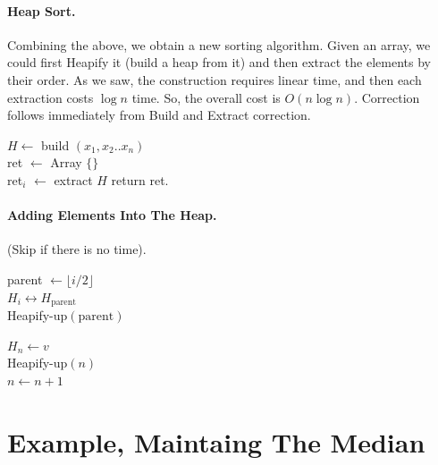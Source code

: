 \newpage


\paragraph{Heap Sort.}   
Combining the above, we obtain a new sorting algorithm. Given an array, we could first Heapify it (build a heap from it) and then extract the elements by their order. As we saw, the construction requires linear time, and then each extraction costs $\log n$ time. So, the overall cost is $O\left( n\log n  \right)$. Correction follows immediately from Build and Extract correction.  
\begin{algorithm}
  $H \leftarrow $ build $ \left( x_1, x_2 .. x_{n}  \right) $ \\ 
  ret $ \leftarrow $ Array $ \{ \} $ \\
   {
  ret$_{i}$ $\leftarrow$ extract $H$
  }
  return ret. 
\end{algorithm}

\paragraph{Adding Elements Into The Heap.} (Skip if there is no time).

\begin{algorithm}
parent $\leftarrow \lfloor i/2 \rfloor $ \\
 { 
  $ H_{i} \leftrightarrow H_{\text{parent}} $ \\ 
  Heapify-up$\left( \text{parent}  \right)$
}
\caption{Heapify-up.}
\end{algorithm}


\begin{algorithm}
$ H_{n} \leftarrow v $ \\ 
Heapify-up$\left( n \right)$\\
$ n \leftarrow n + 1 $ 
\caption{Insert-key}
\end{algorithm}

\newpage 
\fi

\section{Example, Maintaing The Median}


